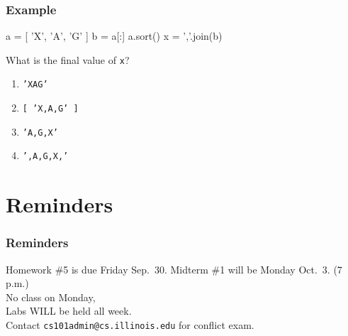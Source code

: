 \documentclass[11pt]{beamer}
\begin{document}
\begin{frame}[fragile]
  \frametitle{Example}
  \Enlarge

  \begin{semiverbatim}
a = [ 'X', 'A', 'G' ]
b = a[:]
a.sort()
x = ','.join(b)
  \end{semiverbatim}
  What is the final value of \texttt{x}?
  \begin{enumerate}[label=\Alph*]
  \item  \texttt{'XAG'}
  \item  \texttt{[ 'X,A,G' ]}
  \item  \texttt{'A,G,X'}
  \item  \texttt{',A,G,X,'}
  \end{enumerate}
\end{frame}

\section{Reminders}

\begin{frame}
  \frametitle{Reminders}
  \Enlarge

  \begin{itemize}
  \myitem  Homework \#5 is due Friday Sep.\ 30.
  \myitem  Midterm \#1 will be Monday Oct.\ 3.  (7 p.m.) \\ \textcolor{CS101GradBot}{No class on Monday, \\ Labs WILL be held all week. \\ Contact \texttt{cs101admin@cs.illinois.edu} for conflict exam.}
  \end{itemize}
\end{frame}
\end{document}
